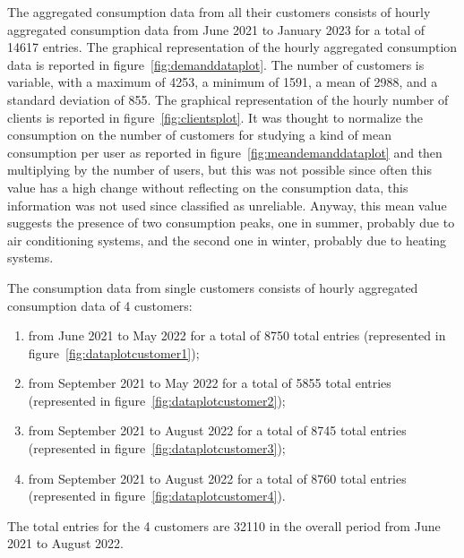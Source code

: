 The aggregated consumption data from all their customers consists of hourly aggregated consumption data from June 2021 to January 2023 for a total of 14617 entries.
The graphical representation of the hourly aggregated consumption data is reported in figure~\ref{fig:demanddataplot}.
The number of customers is variable, with a maximum of 4253, a minimum of 1591, a mean of 2988, and a standard deviation of 855.
The graphical representation of the hourly number of clients is reported in figure~\ref{fig:clientsplot}.
It was thought to normalize the consumption on the number of customers for studying a kind of mean consumption per user as reported in figure~\ref{fig:meandemanddataplot} and then multiplying by the number of users, but this was not possible since often this value has a high change without reflecting on the consumption data, this information was not used since classified as unreliable.
Anyway, this mean value suggests the presence of two consumption peaks, one in summer, probably due to air conditioning systems, and the second one in winter, probably due to heating systems.

The consumption data from single customers consists of hourly aggregated consumption data of 4 customers:
\begin{enumerate}
  \item from June 2021 to May 2022 for a total of 8750 total entries (represented in figure~\ref{fig:dataplotcustomer1});
  \item from September 2021 to May 2022 for a total of 5855 total entries (represented in figure~\ref{fig:dataplotcustomer2});
  \item from September 2021 to August 2022 for a total of 8745 total entries (represented in figure~\ref{fig:dataplotcustomer3});
  \item from September 2021 to August 2022 for a total of 8760 total entries (represented in figure~\ref{fig:dataplotcustomer4}).
\end{enumerate}
The total entries for the 4 customers are 32110 in the overall period from June 2021 to August 2022.

